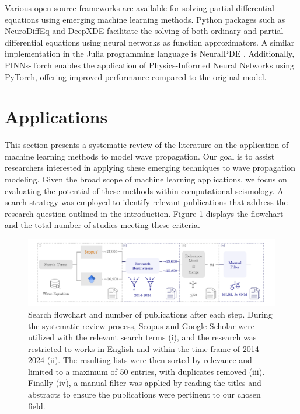 \documentclass[11pt,twoside]{article}
\begin{document}
Various open-source frameworks are available for solving partial differential equations using emerging machine learning methods. Python 
packages such as NeuroDiffEq \citep{chen2020neurodiffeq} and DeepXDE \citep{lu2021deepxde} facilitate the solving of both ordinary and 
partial differential equations using neural networks as function approximators. A similar implementation in the Julia programming language 
is NeuralPDE \citep{https://doi.org/10.48550/arxiv.2107.09443}. Additionally, PINNs-Torch \citep{bafghi_pinns-torch_2023} enables the 
application of Physics-Informed Neural Networks using PyTorch, offering improved performance compared to the original model.

\section{Applications}\label{sec:applications}

This section presents a systematic review of the literature on the application of machine learning methods to model 
wave propagation. Our goal is to assist researchers interested in applying these emerging techniques to wave propagation 
modeling. Given the broad scope of machine learning applications, we focus on evaluating the potential of these methods 
within computational seismology. A search strategy was employed to identify relevant publications that address the research 
question outlined in the introduction. Figure \ref{fig:scheme_systematic_review} displays the flowchart 
and the total number of studies meeting these criteria.

\begin{figure}[h]
    \includegraphics[width=1.0\textwidth]{figs/scheme_systematic_review.pdf}
\caption{Search flowchart and number of publications after each step. During the systematic review process, 
Scopus and Google Scholar were utilized with the relevant search terms (i), and the research was restricted to works 
in English and within the time frame of 2014-2024 (ii). The resulting lists were then sorted by relevance and limited 
to a maximum of 50 entries, with duplicates removed (iii). Finally (iv), a manual filter was applied by reading the 
titles and abstracts to ensure the publications were pertinent to our chosen field.}\label{fig:scheme_systematic_review}
\end{figure}
\end{document}
